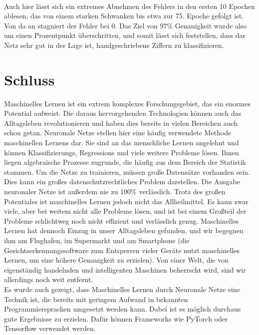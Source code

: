 \documentclass[11pt]{article}
\begin{document}
\\
Auch hier lässt sich ein extremes Abnehmen des Fehlers in den ersten 10 Epochen ablesen, das von einem starken Schwanken bis etwa zur 75. Epoche gefolgt ist. Von da an stagniert der Fehler bei 0. Das Ziel von 97\% Genauigkeit wurde also um einen Prozentpunkt überschritten, und somit lässt sich feststellen, dass das Netz sehr gut in der Lage ist, handgeschriebene Ziffern zu klassifizieren.
\section{Schluss}
Maschinelles Lernen ist ein extrem komplexes Forschungsgebiet, das ein enormes Potential aufweist. Die daraus hervorgehenden Technologien können auch das Alltagsleben revolutionieren und haben dies bereits in vielen Bereichen auch schon getan. Neuronale Netze stellen hier eine häufig verwendete Methode maschinellen Lernens dar. Sie sind an das menschliche Lernen angelehnt und können Klassifizierungs, Regressions und viele weitere Probleme lösen. Ihnen liegen algebraische Prozesse zugrunde, die häufig aus dem Bereich der Statistik stammen. Um die Netze zu trainieren, müssen große Datensätze vorhanden sein. Dies kann ein großes datenschutzrechtliches Problem darstellen. Die Ausgabe neuronaler Netze ist außerdem nie zu 100\% verlässlich. Trotz des großen Potentiales ist maschinelles Lernen jedoch nicht das Allheilmittel. Es kann zwar viele, aber bei weitem nicht alle Probleme lösen, und ist bei einem Großteil der  Probleme schlichtweg noch nicht effizient und verlässlich genug. Maschinelles Lernen hat dennoch Einzug in unser Alltagsleben gefunden, und wir begegnen ihm am Flughafen, im Supermarkt und am Smartphone (die Gesichtserkennungssoftware zum Entsperren vieler Geräte nutzt maschinelles Lernen, um eine höhere Genauigkeit zu erzielen). Von einer Welt, die von eigenständig handelnden und intelligenten Maschinen beherrscht wird, sind wir allerdings noch weit entfernt.\\
Es wurde auch gezeigt, dass Maschinelles Lernen durch Neuronale Netze eine Technik ist, die bereits mit geringem Aufwand in bekannten Programmiersprachen umgesetzt werden kann. Dabei ist es möglich durchaus gute Ergebnisse zu erzielen. Dafür können Frameworks wie PyTorch oder Tensorflow verwendet werden.
\newpage
\end{document}
